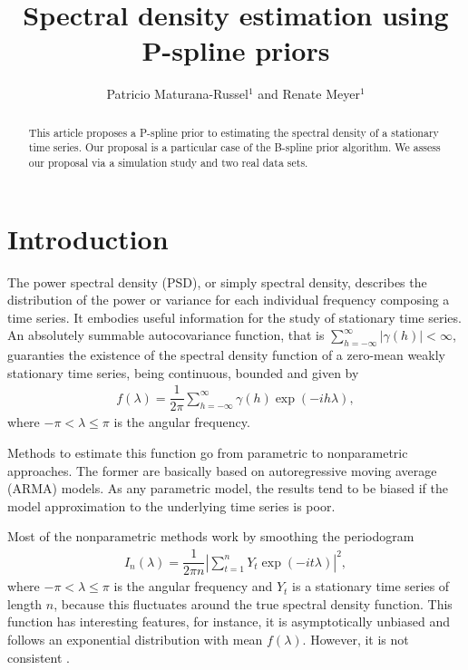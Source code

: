 \documentclass[aps,reprint,amsmath,amssymb,showpacs,showkeys]{revtex4-1}%
\begin{document}
\graphicspath{{figures/}}	

\title[Spectral density estimation using P-spline priors]{Spectral density estimation using P-spline priors}

\author{Patricio Maturana-Russel$^{1}$ and Renate Meyer$^1$}


\begin{abstract}
This article proposes a P-spline prior to estimating the spectral density of a stationary time series.  Our proposal is a particular case of the B-spline prior algorithm.  We assess our proposal via a simulation study and two real data sets.
\end{abstract}




\maketitle

\section{Introduction}
The power spectral density (PSD), or simply spectral density, describes the distribution of the power or variance for each individual frequency composing a time series.  It embodies useful information for the study of stationary time series.  An absolutely summable autocovariance function, that is $\sum_{h=-\infty}^{\infty} |\gamma(h)| <\infty$, guaranties the existence of the spectral density function of a zero-mean weakly stationary time series, being continuous, bounded and given by
\begin{align*}
f(\lambda) = \dfrac{1}{2\pi} \sum_{h = -\infty}^{\infty}\gamma(h)\exp\left(-i h \lambda \right), 
\end{align*}
where $-\pi < \lambda \leq \pi$ is the angular frequency.

Methods to estimate this function go from parametric to nonparametric approaches.  The former are basically based on autoregressive moving average (ARMA) models.  As any parametric model, the results tend to be biased if the model approximation to the underlying time series is poor.  

Most of the nonparametric methods work by smoothing the periodogram
\begin{align*}
I_n(\lambda) = \dfrac{1}{2 \pi n} \left| \sum_{t=1}^{n} Y_t \exp \left( -i t \lambda\right)\right|^2,
\end{align*}
where $-\pi < \lambda \leq \pi$ is the angular frequency and $Y_t$ is a stationary time series of length $n$, because this fluctuates around the true spectral density function.  This function has interesting features, for instance, it is asymptotically unbiased and follows an exponential distribution with mean $f(\lambda)$.  However, it is not consistent \citep{Brockwell:1986}.
\end{document}
